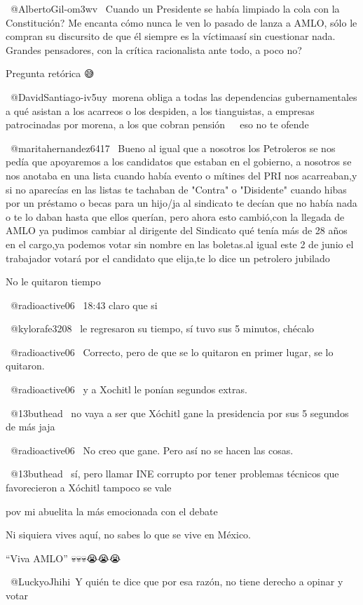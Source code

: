  @AlbertoGil-om3wv  Cuando un Presidente se había limpiado la cola con la Constitución? Me encanta cómo nunca le ven lo pasado de lanza a AMLO, sólo le compran su discursito de que él siempre es la víctimaasí sin cuestionar nada. Grandes pensadores, con la crítica racionalista ante todo, a poco no?

Pregunta retórica 😅

​ @DavidSantiago-iv5uy morena obliga a todas las dependencias gubernamentales a qué asistan a los acarreos o los despiden, a los tianguistas, a empresas patrocinadas por morena, a los que cobran pensión 🤷🏻‍♀️ eso no te ofende

 @maritahernandez6417  Bueno al igual que a nosotros los Petroleros se nos pedía que apoyaremos a los candidatos que estaban en el gobierno, a nosotros se nos anotaba en una lista cuando había evento o mítines del PRI nos acarreaban,y si no aparecías en las listas te tachaban de "Contra" o "Disidente" cuando hibas por un préstamo o becas para un hijo/ja al sindicato te decían que no había nada o te lo daban hasta que ellos querían, pero ahora esto cambió,con la llegada de AMLO ya pudimos cambiar al dirigente del Sindicato qué tenía más de 28 años en el cargo,ya podemos votar sin nombre en las boletas.al igual este 2 de junio el trabajador votará por el candidato que elija,te lo dice un petrolero jubilado

No le quitaron tiempo

 @radioactive06  18:43 claro que si

 @kylorafe3208  le regresaron su tiempo, sí tuvo sus 5 minutos, chécalo

 @radioactive06  Correcto, pero de que se lo quitaron en primer lugar, se lo quitaron.

 @radioactive06  y a Xochitl le ponían segundos extras.

 @13buthead  no vaya a ser que Xóchitl gane la presidencia por sus 5 segundos de más jaja

 @radioactive06  No creo que gane. Pero así no se hacen las cosas.

 @13buthead  sí, pero llamar INE corrupto por tener problemas técnicos que favorecieron a Xóchitl tampoco se vale

pov mi abuelita la más emocionada con el debate

Ni siquiera vives aquí, no sabes lo que se vive en México.

“Viva AMLO” 💀💀💀😭😭😭🤡🤡🤡

​ @LuckyoJhihi Y quién te dice que por esa razón, no tiene derecho a opinar y votar

